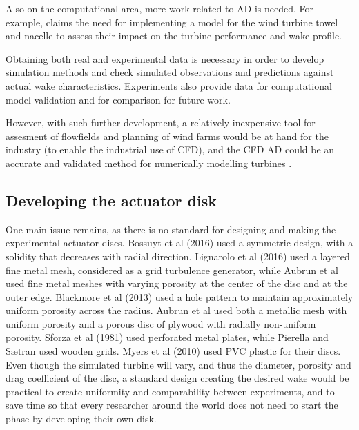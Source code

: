Also on the computational area, more work related to AD is needed. For example, \cite{Tossas2014} claims the need for implementing a model for the wind turbine towel and nacelle to assess their impact on the turbine performance and wake profile. 

Obtaining both real and experimental data is necessary in order to develop simulation methods and check simulated observations and predictions against actual wake characteristics. Experiments also provide data for computational model validation and for comparison for future work. 


However, with such further development, a relatively inexpensive tool for assesment of flowfields and planning of wind farms would be at hand for the industry  (to enable the industrial use of CFD), and the CFD AD could be an accurate and validated method for numerically modelling turbines \cite{Sforza1981} \cite{Harrison2010}. 




\subsection{Developing the actuator disk}

One main issue remains, as there is no standard for designing and making the experimental actuator discs. Bossuyt et al (2016) \cite{Bossuyt2016} used a symmetric design, with a solidity that decreases with radial direction. Lignarolo et al (2016) \cite{Lignarolo2016} used a layered fine metal mesh, considered as a grid turbulence generator, while Aubrun et al \cite{Aubrun2013} used fine metal meshes with varying porosity at the center of the disc and at the outer edge. Blackmore et al (2013) \cite{Blackmore2013} used a hole pattern to maintain approximately uniform porosity across the radius. Aubrun et al \cite{Aubrun2019} used both a metallic mesh with uniform porosity and a porous disc of plywood with radially non-uniform porosity. Sforza et al (1981) \cite{Sforza1981} used perforated metal plates, while Pierella and Sætran \cite{Pierella2010} used wooden grids. Myers et al (2010) \cite{Myers2010} used PVC plastic for their discs. Even though the simulated turbine will vary, and thus the diameter, porosity and drag coefficient of the disc, a standard design creating the desired wake would be practical to create uniformity and comparability between experiments, and to save time so that every researcher around the world does not need to start the phase by developing their own disk. 

